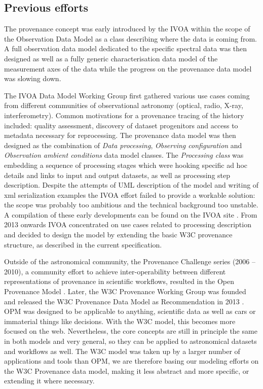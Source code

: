 \subsection{Previous efforts}
The provenance concept was early introduced by the IVOA within the scope of the Observation Data Model \citep[see IVOA note by ][]{note:observationdm} as a class describing where the data is coming from. A full observation data model dedicated to the specific spectral data was then designed \citep[Spectral Data Model,][]{std:SpectralDM} as well as a fully generic characterisation data model of the measurement axes of the data \citep[Characterisation Data Model,][]{std:CharacterisationDM} while the progress on the provenance data model was slowing down.

The IVOA Data Model Working Group first gathered various use cases coming from different communities of observational astronomy (optical, radio, X-ray, interferometry). Common motivations for a provenance tracing of the history included: quality assessment, discovery of dataset progenitors and access to metadata necessary for reprocessing. The provenance data model was then designed as the combination of \emph{Data processing}, \emph{Observing configuration} and \emph{Observation ambient conditions} data model classes. 
The \emph{Processing class} was embedding a sequence of processing stages which were hooking specific ad hoc details and links to input and output datasets, as well as processing step description. 
Despite the attempts of UML description of the model and writing of xml serialization examples the IVOA effort failed to provide a workable solution: the scope was probably too ambitious and the technical background too unstable. A compilation of these early developments can be found on the IVOA site \citep{std:previousefforts}. From 2013 onwards IVOA concentrated on use cases related to processing description and decided to design the model by extending the basic W3C provenance structure, as described in the current specification. 

Outside of the astronomical community, the Provenance Challenge series (2006 -- 2010), a community effort to achieve inter-operability between different representations of provenance in scientific workflows, resulted in the Open Provenance Model \citep{moreau2010}. 
Later, the W3C Provenance Working Group was founded and released the W3C Provenance Data Model as Recommendation in 2013 \citep{std:W3CProvDM}. 
OPM was designed to be applicable to anything, scientific data as well as cars or immaterial things like decisions. With the W3C model, this becomes more focused on the web. Nevertheless, the core concepts are still in principle the same in both models and very general, so they can be applied to astronomical datasets and workflows as well. 
The W3C model was taken up by a larger number of applications and tools than OPM, we are therefore basing our modeling efforts on the W3C Provenance data model, making it less abstract and more specific, or extending it where necessary. 


